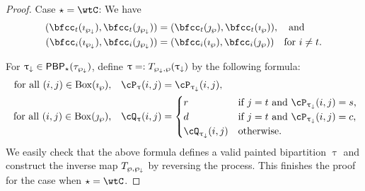 \documentclass[12pt,a4paper]{amsart}
\numberwithin{equation}{section}
\theoremstyle{remark}
\def\BOX#1{\mathrm{Box}(#1)}
\def\AND{\quad \text{and} \quad}
\def\PBP{\mathsf{PBP}}
\def\PBPs{\mathsf{PBP}_{\star}}
\begin{document}
{\begin{proof}
  \medskip




  \smallskip

  Case $\star = \wtC$:
  We have
  \[
    \begin{split}
      (\bfcc_{t}(\imath_{\PPm}), \bfcc_{t}(\jmath_{\PPm}))
      &= (\bfcc_{t}(\jmath_{\wp}), \bfcc_{t}(\imath_{\wp})),\AND\\
      (\bfcc_{i}(\imath_{\PPm}), \bfcc_{i}(\jmath_{\PPm}) )
      & = (\bfcc_{i}(\imath_{\wp}), \bfcc_{i}(\jmath_{\wp}) ) \quad \text{for $i\neq t$}.
    \end{split}
  \]

  For $\uptaum\in\PBPs(\tau_{\PPm})$, define $\uptau=:T_{\wp_{\downarrow},\wp}(\uptau_{\downarrow})$ by the following formula:
  \[
    \begin{split}
      \text{$\textrm{ for all } (i,j)\in \BOX{\imath_{\wp}}$,} \quad   \cP_{\uptau}(i,j) &=  \cP_{\uptaum}(i,j),\\
      \text{$\textrm{ for all } (i,j)\in \BOX{\jmath_{\wp}}$,} \quad \cQ_{\uptau}(i,j) &= \begin{cases}
        r& \text{if $j=t$ and  $\cP_{\uptaum}(i,j)=s$,}\\
        d& \text{if $j=t$ and  $\cP_{\uptaum}(i,j)=c$,}\\
        \cQ_{\uptaum}(i,j) &\text{otherwise.}
      \end{cases}
    \end{split}
  \]
 We easily check that the above formula defines a valid
  painted bipartition $\uptau$ and construct the inverse map $T_{\wp,\wp_{\downarrow}}$ by reversing the process.
  This finishes the proof for the case when $\star=\wtC$. \medskip


\end{proof}}
\end{document}
